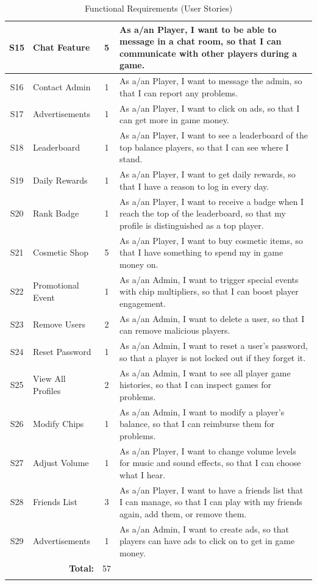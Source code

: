 \documentclass{article}
\begin{document}
\begin{longtable}[h]{c l c p{10cm}}
S15 & Chat Feature & 5 & As a/an Player, I want to be able to message in a chat room, so that I can communicate with other players during a game. \\ \hline
S16 & Contact Admin & 1 & As a/an Player, I want to message the admin, so that I can report any problems. \\ \hline
S17 & Advertisements & 1 & As a/an Player, I want to click on ads, so that I can get more in game money. \\ \hline
S18 & Leaderboard & 1 & As a/an Player, I want to see a leaderboard of the top balance players, so that I can see where I stand. \\ \hline
S19 & Daily Rewards & 1 & As a/an Player, I want to get daily rewards, so that I have a reason to log in every day. \\ \hline
S20 & Rank Badge & 1 & As a/an Player, I want to receive a badge when I reach the top of the leaderboard, so that my profile is distinguished as a top player. \\ \hline
S21 & Cosmetic Shop & 5 & As a/an Player, I want to buy cosmetic items, so that I have something to spend my in game money on. \\ \hline
S22 & Promotional Event & 1 & As a/an Admin, I want to trigger special events with chip multipliers, so that I can boost player engagement. \\ \hline
S23 & Remove Users & 2 & As a/an Admin, I want to delete a user, so that I can remove malicious players. \\ \hline
S24 & Reset Password & 1 & As a/an Admin, I want to reset a user's password, so that a player is not locked out if they forget it. \\ \hline
S25 & View All Profiles & 2 & As a/an Admin, I want to see all player game histories, so that I can inspect games for problems. \\ \hline
S26 & Modify Chips & 1 & As a/an Admin, I want to modify a player's balance, so that I can reimburse them for problems. \\ \hline
S27 & Adjust Volume & 1 & As a/an Player, I want to change volume levels for music and sound effects, so that I can choose what I hear. \\ \hline
S28 & Friends List & 3 & As a/an Player, I want to have a friends list that I can manage, so that I can play with my friends again, add them, or remove them. \\ \hline
S29 & Advertisements & 1 & As a/an Admin, I want to create ads, so that players can have ads to click on to get in game money. \\ \hline

\multicolumn{2}{r}{\bf Total: } & 57 & \\ \hline
\caption{Functional Requirements (User Stories)}\label{tab:functional-req}
\end{longtable}
\end{document}
